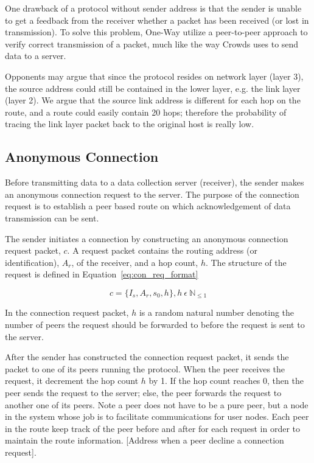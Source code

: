 One drawback of a protocol without sender address is that the sender is unable
to get a feedback from the receiver whether a packet has been received (or
lost in transmission). To solve this problem, One-Way utilize a peer-to-peer
approach to verify correct transmission of a packet, much like the way
Crowds\cite{DBLP:journals/tissec/ReiterR98} uses to send data to a server.

Opponents may argue that since the protocol resides on network layer (layer 3),
the source address could still be contained in the lower layer, e.g. the link
layer (layer 2). We argue that the source link address is different for
each hop on the route, and a route could easily contain 20 hops; therefore
the probability of tracing the link layer packet back to the original host is
really low.

\subsection{Anonymous Connection}\label{anonymous_connection}

Before transmitting data to a data collection server (receiver), the
sender makes an anonymous connection request to the server. The purpose
of the connection request is to establish a peer based route on which
acknowledgement of data transmission can be sent.

The sender initiates a connection by constructing an anonymous
connection request packet, $c$. A request packet contains the routing
address (or identification), $A_r$, of the receiver, and a hop count,
$h$. The structure of the request is defined in
Equation~\ref{eq:con_req_format}

\begin{equation}\label{eq:con_req_format}
c = \{I_s, A_r, s_0, h\}, h~\epsilon~\mathbb{N}_{\leq1}
\end{equation}

In the connection request packet, $h$ is a random natural number
denoting the number of peers the request should be forwarded to
before the request is sent to the server.

After the sender has constructed the connection request packet,
it sends the packet to one of its peers running the protocol. When the
peer receives the request, it decrement the hop count $h$ by 1. If
the hop count reaches 0, then the peer sends the request to the server;
else, the peer forwards the request to another one of its peers. Note
a peer does not have to be a pure peer, but a node in the system whose
job is to facilitate communications for user nodes. Each peer in the
route keep track of the peer before and after for each request in order
to maintain the route information. [Address when a peer decline a
connection request].


